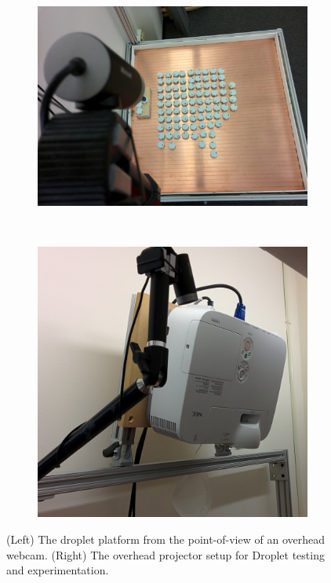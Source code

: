 \documentclass[defaultstyle,12pt]{proposal}
\begin{document}
\begin{figure}[!tb]
\centering\begin{subfigure}{.6\textwidth}
	\centering\includegraphics[scale=.275]{../assets/droplettablewc.png}
\end{subfigure}~
\centering\begin{subfigure}{.4\textwidth}
	\centering\includegraphics[scale=.275]{../assets/droplettablepj.png}
\end{subfigure}
\centering\caption{(Left) The droplet platform from the point-of-view of an overhead webcam. (Right) The overhead projector setup for Droplet testing and experimentation.}
\end{figure}\label{fig:optexpsetup}
\end{document}
